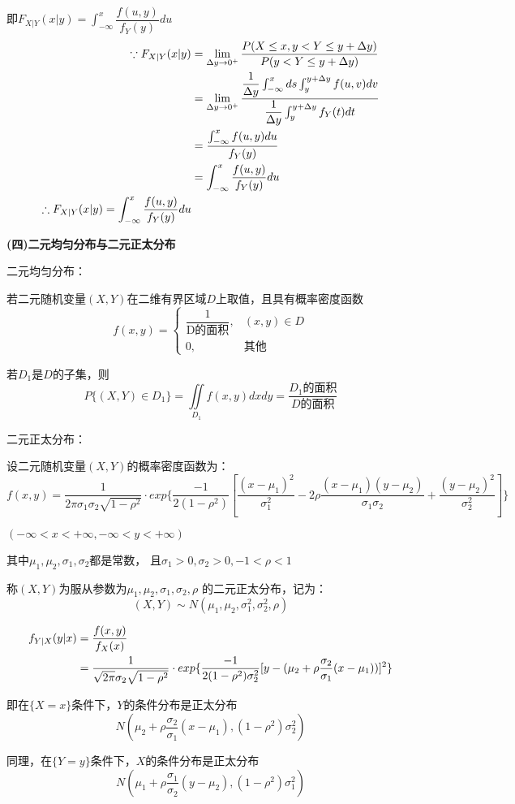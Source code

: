即$F_{X|Y}(x|y)=\int _{-\infty}^x\dfrac{f(u,y)}{f_Y(y)}du$
\begin{align}
    \because F_{X|Y}(x|y)&=\lim \limits_{\Delta y \to 0^+} 
    \dfrac{P(X\leq x,y<Y\leq y+\Delta y)}{P(y<Y\leq y+\Delta y)}\notag
    \\&= \lim \limits_{\Delta y \to 0^+} 
    \dfrac{\dfrac{1}{\Delta y}\int _{-\infty}^x ds \int _y^{y+\Delta y}f(u,v)dv}{\dfrac{1}{\Delta y}\int _y^{y+\Delta y}f_Y(t)dt}\notag
    \\&=\dfrac{\int _{-\infty}^xf(u,y)du}{f_Y(y)}\notag
    \\&=\int _{-\infty}^x \dfrac{f(u,y)}{f_Y(y)}du\notag
    \\\therefore F_{X|Y}(x|y)=\int _{-\infty}^x\dfrac{f(u,y)}{f_Y(y)}du \notag
\end{align}


\textbf{(四)二元均匀分布与二元正太分布}


二元均匀分布：


若二元随机变量$(X,Y)$在二维有界区域$D$上取值，且具有概率密度函数
$$
f(x,y) = \begin{cases}
    \dfrac{1}{\text{D的面积}}, & (x,y) \in D \\
    0, & \text{其他}
\end{cases}
$$


若$D_1$是$D$的子集，则
$$P\{(X,Y)\in D_1\}=\iint \limits_{D_1}f(x,y)dxdy
=\dfrac{D_1\text{的面积}}{D\text{的面积}}$$


二元正太分布：


设二元随机变量$(X,Y)$的概率密度函数为：
$$f(x,y)=\dfrac{1}{2\pi \sigma_1\sigma_2 \sqrt{1-\rho^2}}
\cdot exp\{\dfrac{-1}{2(1-\rho^2)}[\dfrac{(x-\mu_1)^2}{\sigma_1^2}
-2\rho\dfrac{(x-\mu_1)(y-\mu_2)}{\sigma_1\sigma_2}+
\dfrac{(y-\mu_2)^2}{\sigma_2^2}]\}$$


$(-\infty<x<+\infty,-\infty<y<+\infty)$


其中$\mu_1,\mu_2,\sigma_1,\sigma_2$都是常数，
且$\sigma_1>0,\sigma_2>0,-1<\rho<1$


称$(X,Y)$为服从参数为$\mu_1,\mu_2,\sigma_1,\sigma_2,\rho$
的二元正太分布，记为：
$$(X,Y)\sim N(\mu_1,\mu_2,\sigma_1^2,\sigma_2^2,\rho)$$


\begin{align}
    f_{Y|X}(y|x)&=\dfrac{f(x,y)}{f_X(x)}\notag
    \\&=\dfrac{1}{\sqrt{2\pi}\sigma_2\sqrt{1-\rho^2}}
    \cdot exp\{\dfrac{-1}{2(1-\rho^2)\sigma_2^2}[y-(\mu_2+\rho\dfrac{\sigma_2}{\sigma_1}(x-\mu_1))]^2\}\notag
\end{align}


即在$\{X=x\}$条件下，$Y$的条件分布是正太分布
$$N(\mu_2+\rho\dfrac{\sigma_2}{\sigma_1}(x-\mu_1),(1-\rho^2)\sigma_2^2)$$


同理，在$\{Y=y\}$条件下，$X$的条件分布是正太分布
$$N(\mu_1+\rho\dfrac{\sigma_1}{\sigma_2}(y-\mu_2),(1-\rho^2)\sigma_1^2)$$


\newpage
